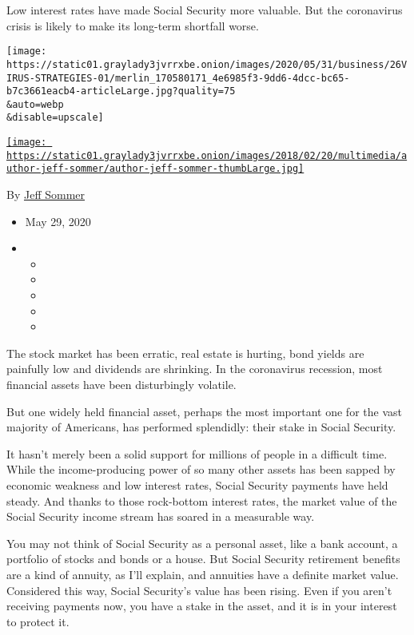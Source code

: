 Low interest rates have made Social Security more valuable. But the
coronavirus crisis is likely to make its long-term shortfall worse.

\texttt{[image: https://static01.graylady3jvrrxbe.onion/images/2020/05/31/business/26VIRUS-STRATEGIES-01/merlin\_170580171\_4e6985f3-9dd6-4dcc-bc65-b7c3661eacb4-articleLarge.jpg?quality=75\\\&auto=webp\\\&disable=upscale]}

\href{https://www.nytimes3xbfgragh.onion/by/jeff-sommer}{\texttt{[image: https://static01.graylady3jvrrxbe.onion/images/2018/02/20/multimedia/author-jeff-sommer/author-jeff-sommer-thumbLarge.jpg]}}

By \href{https://www.nytimes3xbfgragh.onion/by/jeff-sommer}{Jeff Sommer}

\begin{itemize}
\item
  May 29, 2020
\item
  \begin{itemize}
  \item
  \item
  \item
  \item
  \item
  \end{itemize}
\end{itemize}

The stock market has been erratic, real estate is hurting, bond yields
are painfully low and dividends are shrinking. In the coronavirus
recession, most financial assets have been disturbingly volatile.

But one widely held financial asset, perhaps the most important one for
the vast majority of Americans, has performed splendidly: their stake in
Social Security.

It hasn't merely been a solid support for millions of people in a
difficult time. While the income-producing power of so many other assets
has been sapped by economic weakness and low interest rates, Social
Security payments have held steady. And thanks to those rock-bottom
interest rates, the market value of the Social Security income stream
has soared in a measurable way.

You may not think of Social Security as a personal asset, like a bank
account, a portfolio of stocks and bonds or a house. But Social Security
retirement benefits are a kind of annuity, as I'll explain, and
annuities have a definite market value. Considered this way, Social
Security's value has been rising. Even if you aren't receiving payments
now, you have a stake in the asset, and it is in your interest to
protect it.

